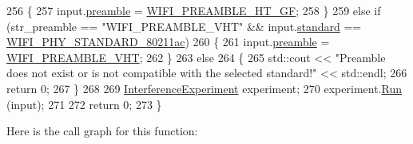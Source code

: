 \begin{DoxyCode}
256     \{
257       input.\hyperlink{structInterferenceExperiment_1_1Input_aa65f6eed675014431f9750aa15197edc}{preamble} = \hyperlink{group__wifi_gga5e94a56cb338a14ffbbb19c6a41251eba82e0b00d79c1f01b7a6e46b693bafd72}{WIFI\_PREAMBLE\_HT\_GF};
258     \}
259   \textcolor{keywordflow}{else} \textcolor{keywordflow}{if} (str\_preamble == \textcolor{stringliteral}{"WIFI\_PREAMBLE\_VHT"} && input.\hyperlink{structInterferenceExperiment_1_1Input_a5c307c4b93ca1d8b5f06a0a143638e1b}{standard} == 
      \hyperlink{group__wifi_gga1299834f4e1c615af3ca738033b76a49a7c078959de635b84fb280a955dcfb27e}{WIFI\_PHY\_STANDARD\_80211ac})
260     \{
261       input.\hyperlink{structInterferenceExperiment_1_1Input_aa65f6eed675014431f9750aa15197edc}{preamble} = \hyperlink{group__wifi_gga5e94a56cb338a14ffbbb19c6a41251ebab90b0fe0b17f27e51c0fe16239e7b089}{WIFI\_PREAMBLE\_VHT};
262     \}
263   \textcolor{keywordflow}{else}
264     \{
265       std::cout << \textcolor{stringliteral}{"Preamble does not exist or is not compatible with the selected standard!"} << std::endl;
266       \textcolor{keywordflow}{return} 0;
267     \}
268 
269   \hyperlink{classInterferenceExperiment}{InterferenceExperiment} experiment;
270   experiment.\hyperlink{classInterferenceExperiment_ae31524d224c311c36d8b1dd5fcc9f269}{Run} (input);
271 
272   \textcolor{keywordflow}{return} 0;
273 \}
\end{DoxyCode}


Here is the call graph for this function\+:


